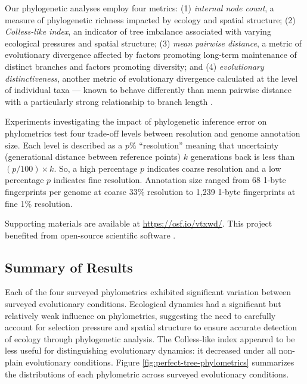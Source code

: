 Our phylogenetic analyses employ four metrics: (1) \textit{internal node count}, a measure of phylogenetic richness impacted by ecology and spatial structure; (2) \textit{Colless-like index}, an indicator of tree imbalance associated with varying ecological pressures and spatial structure; (3) \textit{mean pairwise distance}, a metric of evolutionary divergence affected by factors promoting long-term maintenance of distinct branches and factors promoting diversity; and (4) \textit{evolutionary distinctiveness}, another metric of evolutionary divergence calculated at the level of individual taxa --- known to behave differently than mean pairwise distance with a particularly strong relationship to branch length \citep{tuckerGuidePhylogeneticMetrics2017}.

Experiments investigating the impact of phylogenetic inference error on phylometrics test four trade-off levels between resolution and genome annotation size.
Each level is described as a $p\%$ ``resolution'' meaning that uncertainty (generational distance between reference points) $k$ generations back is less than $(p / 100) \times k$. So, a high percentage $p$ indicates coarse resolution and a low percentage $p$ indicates fine resolution.
Annotation size ranged from 68 1-byte fingerprints per genome at coarse 33\% resolution to 1,239 1-byte fingerprints at fine 1\% resolution.

Supporting materials are available at \url{https://osf.io/vtxwd/}.
This project benefited from open-source scientific software \citep{ofria2020empirical,moreno2022hstrat,lalejini2019data,sukumaran2010dendropy}.

\vspace{-1.5ex}
\subsection{Summary of Results}

Each of the four surveyed phylometrics exhibited significant variation between surveyed evolutionary conditions.
Ecological dynamics had a significant but relatively weak influence on phylometrics, suggesting the need to carefully account for selection pressure and spatial structure to ensure accurate detection of ecology through phylogenetic analysis.
The Colless-like index appeared to be less useful for distinguishing evolutionary dynamics: it decreased under all non-plain evolutionary conditions.
Figure \ref{fig:perfect-tree-phylometrics} summarizes the distributions of each phylometric across surveyed evolutionary conditions.

